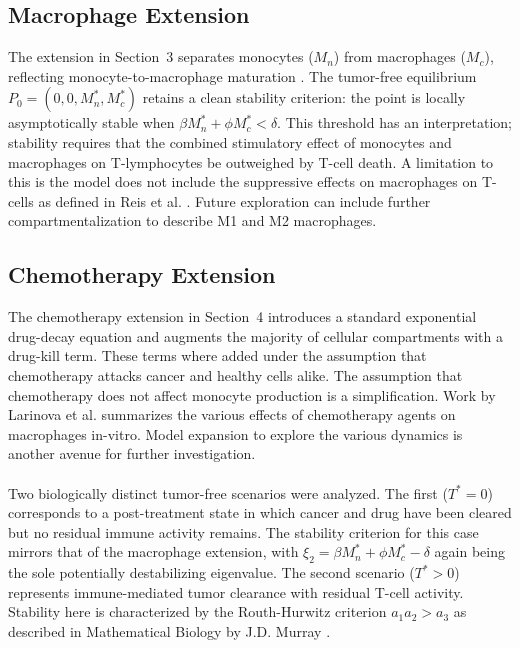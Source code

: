 \documentclass[11pt]{article}
\theoremstyle{definition}
\begin{document}
\subsection*{Macrophage Extension}

The extension in Section~3 separates monocytes ($M_n$) from macrophages
($M_c$), reflecting monocyte-to-macrophage maturation \parencite{reis2021bringing}. The tumor-free equilibrium
$P_0 = (0,0,M_n^*,M_c^*)$ retains a clean stability criterion: the point is
locally asymptotically stable when $\beta M_n^* + \phi M_c^* < \delta$. This
threshold has an interpretation; stability requires that the combined
stimulatory effect of monocytes and macrophages on T-lymphocytes be outweighed
by T-cell death. A limitation to this is the model does not 
include the suppressive effects on macrophages on T-cells as defined in Reis et al. \parencite{reis2021bringing}. Future 
exploration can include further compartmentalization to describe M1 and M2 macrophages. 

\subsection*{Chemotherapy Extension}

The chemotherapy extension in Section~4 introduces a standard exponential
drug-decay equation and augments the majority of cellular compartments with a drug-kill
term. These terms where added under the assumption that chemotherapy attacks cancer and healthy cells alike. 
The assumption that chemotherapy does not
affect monocyte production is a simplification. 
Work by Larinova et al. \parencite{larionova2019interaction} 
summarizes the various effects of chemotherapy agents on macrophages in-vitro. 
Model expansion to explore the various dynamics is another avenue for further investigation. 
\\
\\
Two biologically distinct tumor-free scenarios were analyzed. The first
($T^* = 0$) corresponds to a post-treatment state in which cancer and drug have
been cleared but no residual immune activity remains. The
stability criterion for this case mirrors that of the macrophage extension,
with $\xi_2 = \beta M_n^* + \phi M_c^* - \delta$ again being the sole
potentially destabilizing eigenvalue. The second scenario ($T^* > 0$) represents
immune-mediated tumor
clearance with residual T-cell activity. Stability here is characterized by the
Routh-Hurwitz criterion $a_1 a_2 > a_3$ as described in Mathematical Biology by J.D. Murray \parencite{murray2002mathematical}.
\end{document}
